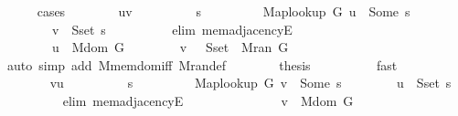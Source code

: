\begin{isabellebody}
\ \ \ \ \isamarkupfalse%
\ {\isacharparenleft}{\kern0pt}cases{\isacharparenright}{\kern0pt}\isanewline
\ \ \ \ \ \ \isamarkupfalse%
\ u{\isacharunderscore}{\kern0pt}v\isanewline
\ \ \ \ \ \ \isamarkupfalse%
\ \isamarkupfalse%
\ s\ \isanewline
\ \ \ \ \ \ \ \ {\isachardoublequoteopen}Map{\isacharunderscore}{\kern0pt}lookup\ G\ u\ {\isacharequal}{\kern0pt}\ Some\ s{\isachardoublequoteclose}\isanewline
\ \ \ \ \ \ \ \ {\isachardoublequoteopen}v\ {\isasymin}\ S{\isachardot}{\kern0pt}set\ s{\isachardoublequoteclose}\isanewline
\ \ \ \ \ \ \ \ \isamarkupfalse%
\ {\isacharparenleft}{\kern0pt}elim\ mem{\isacharunderscore}{\kern0pt}adjacencyE{\isacharparenright}{\kern0pt}\isanewline
\ \ \ \ \ \ \isamarkupfalse%
\isanewline
\ \ \ \ \ \ \ \ {\isachardoublequoteopen}u\ {\isasymin}\ M{\isachardot}{\kern0pt}dom\ G{\isachardoublequoteclose}\isanewline
\ \ \ \ \ \ \ \ {\isachardoublequoteopen}v\ {\isasymin}\ {\isasymUnion}\ {\isacharparenleft}{\kern0pt}S{\isachardot}{\kern0pt}set\ {\isacharbackquote}{\kern0pt}\ M{\isachardot}{\kern0pt}ran\ G{\isacharparenright}{\kern0pt}{\isachardoublequoteclose}\isanewline
\ \ \ \ \ \ \ \ \isamarkupfalse%
\ {\isacharparenleft}{\kern0pt}auto\ simp\ add{\isacharcolon}{\kern0pt}\ M{\isachardot}{\kern0pt}mem{\isacharunderscore}{\kern0pt}dom{\isacharunderscore}{\kern0pt}iff\ M{\isachardot}{\kern0pt}ran{\isacharunderscore}{\kern0pt}def{\isacharparenright}{\kern0pt}\isanewline
\ \ \ \ \ \ \isamarkupfalse%
\ {\isacharquery}{\kern0pt}thesis\isanewline
\ \ \ \ \ \ \ \ \isamarkupfalse%
\ fast\isanewline
\ \ \ \ \isamarkupfalse%
\isanewline
\ \ \ \ \ \ \isamarkupfalse%
\ v{\isacharunderscore}{\kern0pt}u\isanewline
\ \ \ \ \ \ \isamarkupfalse%
\ \isamarkupfalse%
\ s\ \isanewline
\ \ \ \ \ \ \ \ {\isachardoublequoteopen}Map{\isacharunderscore}{\kern0pt}lookup\ G\ v\ {\isacharequal}{\kern0pt}\ Some\ s{\isachardoublequoteclose}\isanewline
\ \ \ \ \ \ \ \ {\isachardoublequoteopen}u\ {\isasymin}\ S{\isachardot}{\kern0pt}set\ s{\isachardoublequoteclose}\isanewline
\ \ \ \ \ \ \ \ \isamarkupfalse%
\ {\isacharparenleft}{\kern0pt}elim\ mem{\isacharunderscore}{\kern0pt}adjacencyE{\isacharparenright}{\kern0pt}\isanewline
\ \ \ \ \ \ \isamarkupfalse%
\isanewline
\ \ \ \ \ \ \ \ {\isachardoublequoteopen}v\ {\isasymin}\ M{\isachardot}{\kern0pt}dom\ G{\isachardoublequoteclose}\isanewline

\end{isabellebody}
